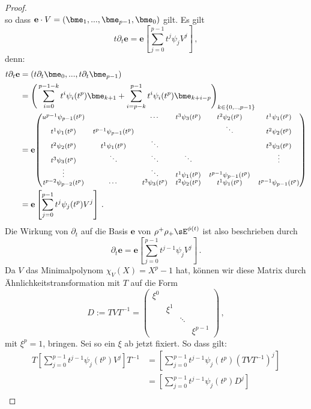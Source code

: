 \begin{proof}
\[\]
so dass $\mathbf{e}\cdot V=(\bme_1,...,\bme_{p-1},\bme_0)$ gilt.
Es gilt
\[
t\partial_t\mathbf{e}=\mathbf{e}\left[\sum_{j=0}^{p-1}t^j\psi_jV^j\right] \,,
\]
denn:
\begin{align*}
  t\partial_t\mathbf{e} &= (t\partial_t\bme_0,...,t\partial_t\bme_{p-1})\\
  &= \Bigg(\sum_{i=0}^{p-1-k}t^i\psi_i(t^p)\bme_{k+1} +
    \sum_{i=p-k}^{p-1}t^i\psi_i(t^p)\bme_{k+i-p}\Bigg)_{k\in\{0,..,p-1\}}\\
  &= \mathbf{e}
{ %
  \footnotesize
  \begin{pmatrix}u^{p-1}\psi_{p-1}(t^p) && \cdots & t^{3}\psi_{3}(t^p) & t^{2}
  \psi_{2}(t^p) & t^{1}\psi_{1}(t^p)\\
  t^{1}\psi_{1}(t^p) & t^{p-1}\psi_{p-1}(t^p) &  &
  & \ddots & t^{2}\psi_{2}(t^p)\\
  t^{2}\psi_{2}(t^p) & t^{1}\psi_{1}(t^p) & \ddots &  &  & t^{3}\psi_{3}(t^p)\\
  t^{3}\psi_{3}(t^p) & \ddots & \ddots & \ddots &  & \vdots\\
  \vdots &  & \ddots & t^{1}\psi_{1}(t^p) & t^{p-1}\psi_{p-1}(t^p)\\
  t^{p-2}\psi_{p-2}(t^p) & \cdots & t^{3}\psi_{3}(t^p) & t^{2}\psi_{2}(t^p) &
  t^{1}\psi_{1}(t^p) & t^{p-1}\psi_{p-1}(t^p)
  \end{pmatrix}
} \\
  &= \mathbf{e}\left[\sum_{j=0}^{p-1}t^j\psi_j(t^p)V^j\right] \,.
\end{align*}
Die Wirkung von $\partial_t$ auf die Basis $\mathbf{e}$ von
$\rho^+\rho_+\sE^{\phi(t)}$ ist also beschrieben durch
\[
\partial_t\mathbf{e}=\mathbf{e}\left[\sum_{j=0}^{p-1}t^{j-1}\psi_jV^j\right]\,.
\]
Da $V$ das Minimalpolynom $\chi_V(X)=X^p-1$ hat, können wir diese Matrix durch
Ähnlichkeitstransformation mit $T$ auf die Form
\[
D:=TVT^{-1}=\begin{pmatrix}\xi^{0}\\
 & \xi^{1}\\
 &  & \ddots\\
 &  &  & \xi^{p-1}
\end{pmatrix} \,,
\]
mit $\xi^p=1$, bringen. Sei so ein $\xi$ ab jetzt fixiert. %
So dass gilt:
\begin{align*}
  T\left[\sum_{j=0}^{p-1}t^{j-1}\psi_j(t^p)V^j\right]T^{-1} 
  &= \left[\sum_{j=0}^{p-1}t^{j-1}\psi_j(t^p) (TVT^{-1})^j\right]\\
  &= \left[\sum_{j=0}^{p-1}t^{j-1}\psi_j(t^p)D^j\right]\\

\end{align*}
\end{proof}
